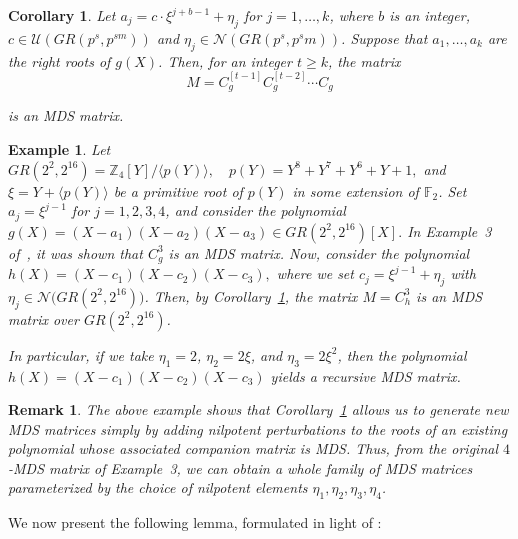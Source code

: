 \documentclass[11pt]{article}
\newtheorem{corollary}{Corollary}
\newtheorem{example}{Example}
\newtheorem{remark}{Remark}
\begin{document}
\begin{corollary}\label{Corollary 1003}
    Let $a_j = c\cdot\xi^{j + b - 1}+\eta_j$ for $j = 1, \dots, k$, where $b$ is an integer, $c\in \mathcal{U}(GR(p^s,p^{sm}))$ and $\eta_j\in \mathcal{\mathcal{N}}(GR(p^s,p^sm))$.  
Suppose that $a_1, \dots, a_k$ are the right roots of $g(X)$. Then, for an integer 
$t \geq k$, the matrix 
\[
M = C_g^{[t-1]} C_g^{[t-2]} \cdots C_g
\] 

is an \textup{MDS} matrix.
\end{corollary}
\begin{example}
Let 
\(
GR(2^2, 2^{16}) = \mathbb{Z}_4[Y]/\langle p(Y)\rangle, \quad 
p(Y) = Y^8 + Y^7 + Y^6 + Y + 1,
\)
and  $\xi = Y + \langle p(Y)\rangle$ be a primitive root of $p(Y)$ in some extension of $\mathbb{F}_2$.  
Set $a_j = \xi^{j-1}$ for $j = 1, 2, 3, 4$, and consider the polynomial
\(
g(X) = (X - a_1)(X - a_2)(X - a_3)\in GR(2^2,2^{16})[X].
\)
In Example~3 of~\cite{Kesarwani2021}, it was shown that $C^3_g$ is an MDS matrix. 
Now, consider the polynomial
\(
h(X) = (X - c_1)(X - c_2)(X - c_3),
\)
where we set $c_j = \xi^{j-1} + \eta_j$ with $\eta_j \in \mathcal{N}\big(GR(2^2, 2^{16})\big)$. 
Then, by Corollary~\ref{Corollary 1003}, the matrix
\(
M = C_h^3
\)
is an \textup{MDS} matrix over $GR(2^2, 2^{16})$.

In particular, if we take $\eta_1 = 2$, $\eta_2 = 2\xi$, and $\eta_3 = 2\xi^2$, then the polynomial
\(
h(X) = (X - c_1)(X - c_2)(X - c_3)
\)
yields a recursive MDS matrix. 
\end{example}

\begin{remark}
    The above example shows that Corollary~\ref{Corollary 1003} allows us to generate new MDS matrices simply by adding nilpotent perturbations to the roots of an existing polynomial whose associated companion matrix is MDS.  
Thus, from the original $4$-MDS matrix of Example~3, we can obtain a whole family of MDS matrices parameterized by the choice of nilpotent elements $\eta_1, \eta_2, \eta_3,\eta_4$.
\end{remark}



We now present the following lemma, formulated in light of \cite[Theorem~15]{Ali2024block}:
\end{document}
